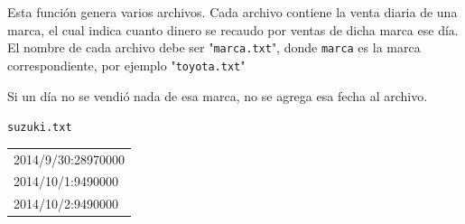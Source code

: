 \begin{itemize}
    Esta función genera varios archivos. Cada archivo contiene la venta diaria de una marca, el cual indica cuanto dinero se recaudo por ventas de dicha marca ese día. El nombre de cada archivo debe ser "\texttt{marca.txt}", donde \texttt{marca} es la marca correspondiente, por ejemplo "\texttt{toyota.txt}"
    
    Si un día no se vendió nada de esa marca, no se agrega esa fecha al archivo.
    
\begin{center}
    \texttt{suzuki.txt} 
    
    \begin{tabular}{|l|}
\hline
2014/9/30:28970000 \\
2014/10/1:9490000 \\
2014/10/2:9490000 \\
\hline
    \end{tabular}
\end{center}

\end{itemize}

